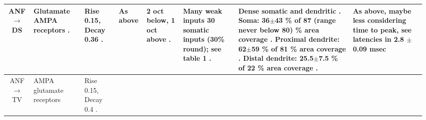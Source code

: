 \begin{longtable}{cXXXXXXX}
\\ \midrule
ANF\ensuremath{\rightarrow}DS                   
& %
Glutamate  AMPA receptors \citep{FerragamoGoldingEtAl:1998a,WentholdHunterEtAl:1993}.
& %
Rise 0.15, Decay 0.36 \citep{GardnerTrussellEtAl:1999,Oertel:1983}.  
& %
As above
& %
2 oct below, 1 oct above \citep{PalmerJiangEtAl:1996}. 
& %
Many weak inputs \citep{FerragamoGoldingEtAl:1998a} 
30 somatic inputs (30\% round); see table 1 \citep{SmithRhode:1989}.
& %
Dense somatic and dendritic \citep{Cant:1981,Cant:1982,RyugoWrightEtAl:1993}.
Soma: 36$\pm$43 \%  of 87 (range never below 80) \% area coverage   \citep[cat][]{SmithRhode:1989}. 
Proximal dendrite: 62$\pm$59 \%  of 81 \% area coverage   \citep[cat][]{SmithRhode:1989}. 
Distal dendrite: 25.5$\pm$7.5 \%  of 22 \% area coverage   \citep[cat][]{SmithRhode:1989}. 
& %
As above, maybe less considering time to peak,
see latencies in \citep{PaoliniClark:1999} 
2.8 $\pm$0.09 msec \citep[Oc latency]{RhodeSmith:1986} 
\\ \midrule

ANF \ensuremath{\rightarrow}TV                       
& %
AMPA glutamate receptors \citep{ZhangOertel:1993}                          
& %
Rise 0.15, Decay 0.4 \citep{GardnerTrussellEtAl:1999}.

& %
& %


\end{longtable}
